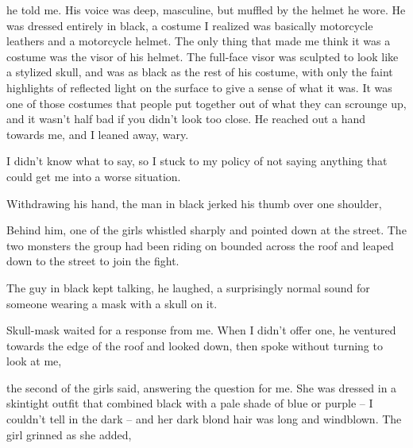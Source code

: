  he told me. His voice was deep, masculine, but muffled by the helmet he wore. He was dressed entirely in black, a costume I realized was basically motorcycle leathers and a motorcycle helmet. The only thing that made me think it was a costume was the visor of his helmet. The full-face visor was sculpted to look like a stylized skull, and was as black as the rest of his costume, with only the faint highlights of reflected light on the surface to give a sense of what it was. It was one of those costumes that people put together out of what they can scrounge up, and it wasn't half bad if you didn't look too close. He reached out a hand towards me, and I leaned away, wary.

I didn't know what to say, so I stuck to my policy of not saying anything that could get me into a worse situation.

Withdrawing his hand, the man in black jerked his thumb over one shoulder, 

Behind him, one of the girls whistled sharply and pointed down at the street. The two monsters the group had been riding on bounded across the roof and leaped down to the street to join the fight.

The guy in black kept talking,  he laughed, a surprisingly normal sound for someone wearing a mask with a skull on it.

 Skull-mask waited for a response from me. When I didn't offer one, he ventured towards the edge of the roof and looked down, then spoke without turning to look at me, 

 the second of the girls said, answering the question for me. She was dressed in a skintight outfit that combined black with a pale shade of blue or purple -- I couldn't tell in the dark -- and her dark blond hair was long and windblown. The girl grinned as she added, 

